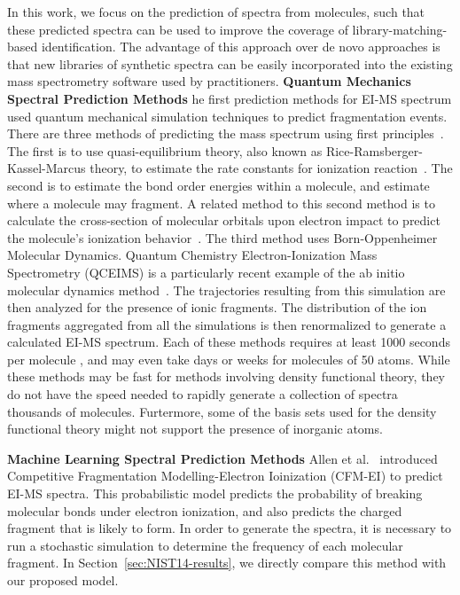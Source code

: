 In this work, we focus on the prediction of spectra from molecules, such that these predicted spectra can be used to improve the coverage of library-matching-based identification. The advantage of this approach over de novo approaches is that new libraries of synthetic spectra can be easily incorporated into the existing mass spectrometry software used by practitioners.
\textbf{Quantum Mechanics Spectral Prediction Methods}
he first prediction methods for EI-MS spectrum used quantum mechanical simulation techniques to predict fragmentation events. There are three methods of predicting the mass spectrum using first principles~\cite{bauer2016compute}.
The first is to use quasi-equilibrium theory, also known as Rice-Ramsberger-Kassel-Marcus theory, to estimate the rate constants for ionization reaction~\cite{lorquet1994whither, lorquet2000landmarks, rosenstock1952absolute}.
The second is to estimate the bond order energies within a molecule, and estimate where a molecule may fragment. A related method to this second method is to calculate the cross-section of molecular orbitals upon electron impact to predict the molecule's ionization behavior~\cite{irikura2017ab, Guerra_BEB_model}.
The third method uses Born-Oppenheimer Molecular Dynamics. Quantum Chemistry Electron-Ionization Mass Spectrometry (QCEIMS) is a particularly recent example of the ab initio molecular dynamics method~\cite{grimme2013towards,Asgeirsson_QCEIMS,bauer2016compute}.
The trajectories resulting from this simulation are then analyzed for the presence of ionic fragments. The distribution of the ion fragments aggregated from all the simulations is then renormalized to generate a calculated EI-MS spectrum.
Each of these methods requires at least 1000 seconds per molecule \cite{allen2016computational}, and may even take days or weeks for molecules of 50 atoms. While these methods may be fast for methods involving density functional theory, they do not have the speed needed to rapidly generate a collection of spectra thousands of molecules. Furtermore, some of the basis sets used for the density functional theory might not support the presence of inorganic atoms.

\textbf{Machine Learning Spectral Prediction Methods} Allen et al.~\cite{allen2016computational} introduced Competitive Fragmentation Modelling-Electron Ioinization (CFM-EI) to predict EI-MS spectra. This probabilistic model predicts the probability of breaking molecular bonds under electron ionization, and also predicts the charged fragment that is likely to form. In order to generate the spectra, it is necessary to run a stochastic simulation to determine the frequency of each molecular fragment.
In Section~\ref{sec:NIST14-results}, we directly compare this method with our proposed model.




